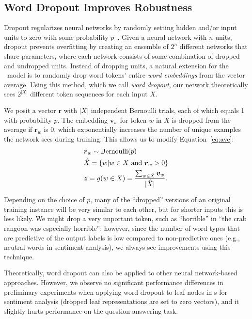 \subsection{Word Dropout Improves Robustness}




Dropout regularizes neural networks by randomly setting hidden and/or input
units to zero with some probability
$p$~\cite{hintondropout,srivastava2014dropout}. Given a neural network with $n$
units, dropout prevents overfitting by creating an ensemble of $2^n$ different
networks that share parameters, where each network consists of some combination
of dropped and undropped units. Instead of dropping units,
a natural extension for the \dan\ model is to randomly drop word tokens' entire
\emph{word embeddings} from the vector average. Using this method, which we call
\emph{word dropout}, our network theoretically sees $2^{|X|}$ different token sequences for each
input $X$.

We posit a vector $\boldsymbol{r}$ with $|X|$ independent Bernoulli trials, each
of which equals 1 with probability $p$. The embedding $\boldsymbol{v}_w$ for
token $w$ in $X$ is dropped from the average if $\boldsymbol{r}_w$ is 0, which
exponentially increases the number of unique examples the network sees during
training.  This allows us to modify Equation~\ref{eq:ave}:
\begin{align}\label{eq:dropped}
&\boldsymbol{r}_w \sim \text{Bernoulli}(p) \\
&\hat X = \{w | w \in X \text{ and } \boldsymbol{r}_w > 0\} \\
& \boldsymbol{z} = g(w \in X) = \frac{\sum_{w \in \hat X} \boldsymbol{v}_w}{| \hat X |}.
\end{align}

Depending on the choice of $p$, many of the ``dropped'' versions of an original
training instance will be very similar to each other, but for shorter inputs
this is less likely. We might drop a very important token, such as ``horrible''
in ``the crab rangoon was especially horrible''; however, since the number of
word types that are predictive of the output labels is low compared to
non-predictive ones (e.g., neutral words in sentiment analysis), we always see
improvements using this technique.

Theoretically, word dropout can also be applied to other neural
network-based approaches. However, we observe no significant
performance differences in preliminary experiments when applying word
dropout to leaf nodes in \recnn s for sentiment analysis (dropped leaf
representations are set to zero vectors), and it slightly hurts
performance on the question answering task. 

























